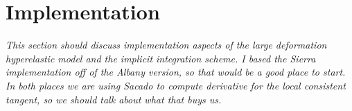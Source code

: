 \chapter{Implementation}
\label{implementation}

\textit{This section should discuss implementation aspects of the
  large deformation hyperelastic model and the implicit integration
  scheme. I based the Sierra implementation off of the Albany version,
  so that would be a good place to start. In both places we are using
  Sacado to compute derivative for the local consistent tangent, so we
  should talk about what that buys us.}

